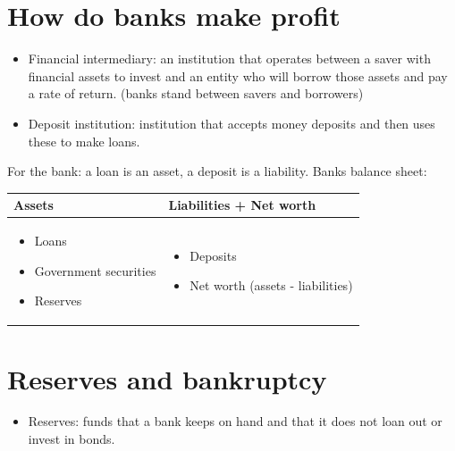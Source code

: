 \documentclass[openany]{book}
\begin{document}
\section{How do banks make profit}
\begin{itemize}
    \item Financial intermediary: an institution that operates between a saver with financial assets to invest and an entity who will borrow those assets and pay a rate of return. (banks stand between savers and borrowers)
    \item Deposit institution: institution that accepts money deposits and then uses these to make loans.
\end{itemize}
For the bank: a loan is an asset, a deposit is a liability. Banks balance sheet: 
\begin{center}
    \begin{tabular}{ |p{6cm}|p{6cm}| }
        \hline
            Assets & Liabilities + Net worth  \\
        \hline
            \begin{itemize}
                \item Loans 
                \item Government securities 
                \item Reserves 
            \end{itemize}
            & 
            \begin{itemize}
                \item Deposits 
                \item Net worth (assets - liabilities)
            \end{itemize}
            \\ 
        \hline
    \end{tabular}
\end{center}

\section{Reserves and bankruptcy}
\begin{itemize}
    \item Reserves: funds that a bank keeps on hand and that it does not loan out or invest in bonds.
\end{itemize}


\end{document}
